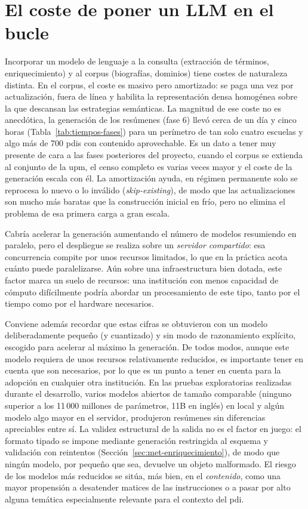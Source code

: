 \section{El coste de poner un LLM en el bucle}
\label{sec:disc-coste-llm}

Incorporar un modelo de lenguaje a la consulta (extracción de términos, enriquecimiento) y al corpus (biografías, dominios) tiene costes de naturaleza distinta.
En el corpus, el coste es masivo pero amortizado: se paga una vez por actualización, fuera de línea y habilita la representación densa homogénea sobre la que descansan las estrategias semánticas.
La magnitud de ese coste no es anecdótica, la generación de los resúmenes (fase 6) llevó cerca de un día y cinco horas (Tabla~\ref{tab:tiempos-fases}) para un perímetro de tan solo cuatro escuelas y algo más de 700 \glspl{pdi} con contenido aprovechable.
Es un dato a tener muy presente de cara a las fases posteriores del proyecto, cuando el corpus se extienda al conjunto de la \gls{upm}, el censo completo es varias veces mayor y el coste de la generación escala con él.
La amortización ayuda, en régimen permanente solo se reprocesa lo nuevo o lo inválido (\emph{skip-existing}), de modo que las actualizaciones son mucho más baratas que la construcción inicial en frío, pero no elimina el problema de esa primera carga a gran escala.

Cabría acelerar la generación aumentando el número de modelos resumiendo en paralelo, pero el despliegue se realiza sobre un \emph{servidor compartido}: esa concurrencia compite por unos recursos limitados, lo que en la práctica acota cuánto puede paralelizarse.
Aún sobre una infraestructura bien dotada, este factor marca un suelo de recursos: una institución con menos capacidad de cómputo difícilmente podría abordar un procesamiento de este tipo, tanto por el tiempo como por el hardware necesarios.

Conviene además recordar que estas cifras se obtuvieron con un modelo deliberadamente pequeño (y cuantizado) y sin modo de razonamiento explícito, escogido para acelerar al máximo la generación.
De todos modos, aunque este modelo requiera de unos recursos relativamente reducidos, es importante tener en cuenta que son necesarios, por lo que es un punto a tener en cuenta para la adopción en cualquier otra institución. 
En las pruebas exploratorias realizadas durante el desarrollo, varios modelos abiertos de tamaño comparable (ninguno superior a los 11\,000 millones de parámetros, 11B en inglés) en local y algún modelo algo mayor en el servidor, produjeron resúmenes sin diferencias apreciables entre sí.
La validez estructural de la salida no es el factor en juego: el formato tipado se impone mediante generación restringida al esquema y validación con reintentos (Sección~\ref{sec:met-enriquecimiento}), de modo que ningún modelo, por pequeño que sea, devuelve un objeto malformado.
El riesgo de los modelos más reducidos se sitúa, más bien, en el \emph{contenido}, como una mayor propensión a desatender matices de las instrucciones o a pasar por alto alguna temática especialmente relevante para el contexto del \gls{pdi}.

